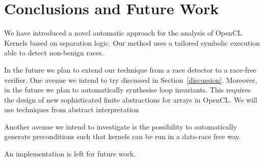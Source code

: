 \documentclass[a4paper,11pt]{llncs}
\begin{document}
\section{Conclusions and Future Work}
\label{sec:conclusion}
We have introduced a novel automatic approach for the analysis of OpenCL Kernels based on separation logic.
Our method uses a tailored symbolic execution able to detect non-benign races.

In the future we plan to extend our technique from a race detector to a race-free verifier. One avenue we intend to try  discussed in Section~\ref{discussion}.
Moreover, in the future we plan  to  automatically synthesise loop invariants. This requires the design of  new sophisticated finite abstractions for arrays in OpenCL. We will use techniques from abstract interpretation~\cite{CousotCousotPOPL77} 

Another avenue we intend to investigate is the possibility to automatically generate  preconditions such that kernels can be run in a data-race free way. 

An implementation is left for future work.




\end{document}
